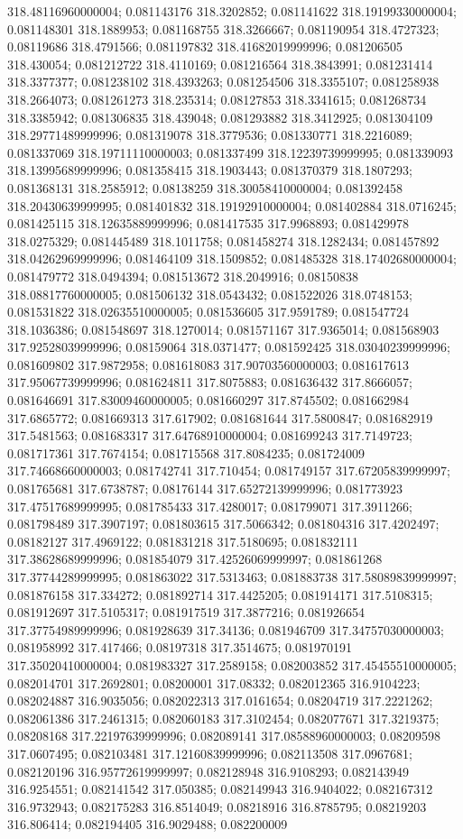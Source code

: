 318.48116960000004; 0.081143176 318.3202852; 0.081141622 318.19199330000004; 0.081148301 318.1889953; 0.081168755 318.3266667; 0.081190954 318.4727323; 0.08119686 318.4791566; 0.081197832 318.41682019999996; 0.081206505 318.430054; 0.081212722 318.4110169; 0.081216564 318.3843991; 0.081231414 318.3377377; 0.081238102 318.4393263; 0.081254506 318.3355107; 0.081258938 318.2664073; 0.081261273 318.235314; 0.08127853 318.3341615; 0.081268734 318.3385942; 0.081306835 318.439048; 0.081293882 318.3412925; 0.081304109 318.29771489999996; 0.081319078 318.3779536; 0.081330771 318.2216089; 0.081337069 318.19711110000003; 0.081337499 318.12239739999995; 0.081339093 318.13995689999996; 0.081358415 318.1903443; 0.081370379 318.1807293; 0.081368131 318.2585912; 0.08138259 318.30058410000004; 0.081392458 318.20430639999995; 0.081401832 318.19192910000004; 0.081402884 318.0716245; 0.081425115 318.12635889999996; 0.081417535 317.9968893; 0.081429978 318.0275329; 0.081445489 318.1011758; 0.081458274 318.1282434; 0.081457892 318.04262969999996; 0.081464109 318.1509852; 0.081485328 318.17402680000004; 0.081479772 318.0494394; 0.081513672 318.2049916; 0.08150838 318.08817760000005; 0.081506132 318.0543432; 0.081522026 318.0748153; 0.081531822 318.02635510000005; 0.081536605 317.9591789; 0.081547724 318.1036386; 0.081548697 318.1270014; 0.081571167 317.9365014; 0.081568903 317.92528039999996; 0.08159064 318.0371477; 0.081592425 318.03040239999996; 0.081609802 317.9872958; 0.081618083 317.90703560000003; 0.081617613 317.95067739999996; 0.081624811 317.8075883; 0.081636432 317.8666057; 0.081646691 317.83009460000005; 0.081660297 317.8745502; 0.081662984 317.6865772; 0.081669313 317.617902; 0.081681644 317.5800847; 0.081682919 317.5481563; 0.081683317 317.64768910000004; 0.081699243 317.7149723; 0.081717361 317.7674154; 0.081715568 317.8084235; 0.081724009 317.74668660000003; 0.081742741 317.710454; 0.081749157 317.67205839999997; 0.081765681 317.6738787; 0.08176144 317.65272139999996; 0.081773923 317.47517689999995; 0.081785433 317.4280017; 0.081799071 317.3911266; 0.081798489 317.3907197; 0.081803615 317.5066342; 0.081804316 317.4202497; 0.08182127 317.4969122; 0.081831218 317.5180695; 0.081832111 317.38628689999996; 0.081854079 317.42526069999997; 0.081861268 317.37744289999995; 0.081863022 317.5313463; 0.081883738 317.58089839999997; 0.081876158 317.334272; 0.081892714 317.4425205; 0.081914171 317.5108315; 0.081912697 317.5105317; 0.081917519 317.3877216; 0.081926654 317.37754989999996; 0.081928639 317.34136; 0.081946709 317.34757030000003; 0.081958992 317.417466; 0.08197318 317.3514675; 0.081970191 317.35020410000004; 0.081983327 317.2589158; 0.082003852 317.45455510000005; 0.082014701 317.2692801; 0.08200001 317.08332; 0.082012365 316.9104223; 0.082024887 316.9035056; 0.082022313 317.0161654; 0.08204719 317.2221262; 0.082061386 317.2461315; 0.082060183 317.3102454; 0.082077671 317.3219375; 0.08208168 317.22197639999996; 0.082089141 317.08588960000003; 0.08209598 317.0607495; 0.082103481 317.12160839999996; 0.082113508 317.0967681; 0.082120196 316.95772619999997; 0.082128948 316.9108293; 0.082143949 316.9254551; 0.082141542 317.050385; 0.082149943 316.9404022; 0.082167312 316.9732943; 0.082175283 316.8514049; 0.08218916 316.8785795; 0.08219203 316.806414; 0.082194405 316.9029488; 0.082200009 